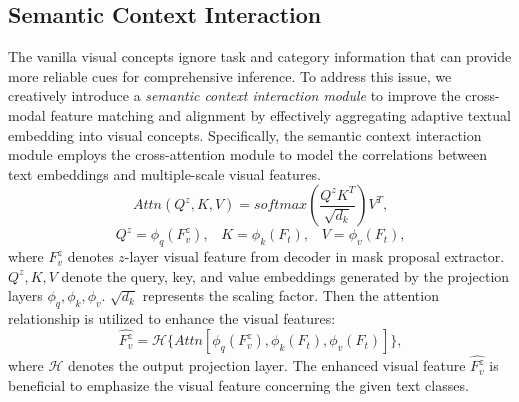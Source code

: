 \documentclass[10pt,twocolumn,letterpaper]{article}
\begin{document}
\subsection{Semantic Context Interaction}
\label{sec: interaction}
The vanilla visual concepts ignore task and category information that can provide more reliable cues for comprehensive inference. To address this issue, we creatively introduce a \textit{semantic context interaction module} to improve the cross-modal feature matching and alignment by effectively aggregating adaptive textual embedding into visual concepts.
Specifically, the semantic context interaction module employs the cross-attention module to model the correlations between text embeddings and multiple-scale visual features.
\begin{equation}
  Attn(Q^z, K, V) = softmax(\frac{Q^zK^T}{\sqrt{d_k}})V^T   \text{,}
  \end{equation}
\begin{equation}
    Q^z = \phi_q (F_{v}^z)\text{,} \quad K = \phi_k (F_t)\text{,}  \quad V = \phi_v (F_t) \text{,}
    \end{equation}
where $F_{v}^z$ denotes $z$-layer visual feature from decoder in mask proposal extractor.
$Q^z, K, V$ denote the query, key, and value embeddings generated by the projection layers $\phi_q, \phi_k, \phi_v$. $\sqrt{d_k}$ represents the scaling factor. Then the attention relationship is utilized to enhance the visual features:
\begin{equation}
  \hat{F_{v}^z} = \mathcal{H} \{Attn[\phi_q (F_{v}^z),\phi_k (F_t), \phi_v (F_t)]\} \text{,}
  \end{equation}
where $\mathcal{H}$ denotes the output projection layer. The enhanced visual feature $\hat{F_{v}^z}$ is beneficial to emphasize the visual feature concerning the given text classes.
\end{document}
